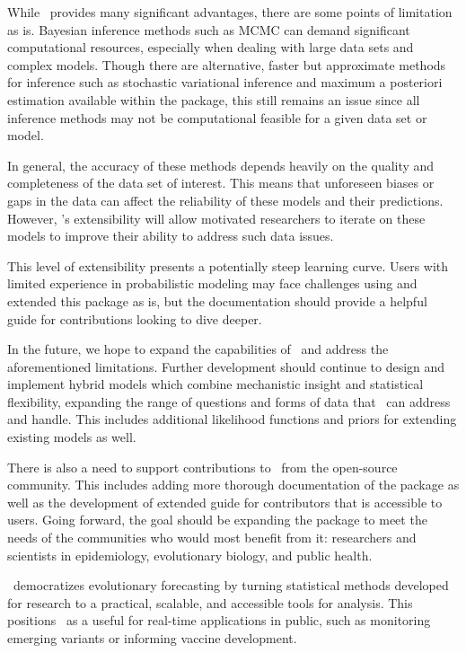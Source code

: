 While \evofr\ provides many significant advantages, there are some points of limitation as is.
Bayesian inference methods such as MCMC can demand significant computational resources, especially when dealing with large data sets and complex models.
  Though there are alternative, faster but approximate methods for inference such as stochastic variational inference and maximum a posteriori estimation available within the package, this still remains an issue since all inference methods may not be computational feasible for a given data set or model.

In general, the accuracy of these methods depends heavily on the quality and completeness of the data set of interest.
This means that unforeseen biases or gaps in the data can affect the reliability of these models and their predictions.
However, \evofr's extensibility will allow motivated researchers to iterate on these models to improve their ability to address such data issues.

This level of extensibility presents a potentially steep learning curve. 
Users with limited experience in probabilistic modeling may face challenges using and extended this package as is, but the documentation should provide a helpful guide for contributions looking to dive deeper.

In the future, we hope to expand the capabilities of \evofr\ and address the aforementioned limitations.
Further development should continue to design and implement hybrid models which combine mechanistic insight and statistical flexibility, expanding the range of questions and forms of data that \evofr\ can address and handle.
This includes additional likelihood functions and priors for extending existing models as well.

There is also a need to support contributions to \evofr\ from the open-source community.
This includes adding more thorough documentation of the package as well as the development of extended guide for contributors that is accessible to users.
Going forward, the goal should be expanding the package to meet the needs of the communities who would most benefit from it: researchers and scientists in epidemiology, evolutionary biology, and public health.

\evofr\ democratizes evolutionary forecasting by turning statistical methods developed for research to a practical, scalable, and accessible tools for analysis.
This positions \evofr\ as a useful for real-time applications in public, such as monitoring emerging variants or informing vaccine development.

